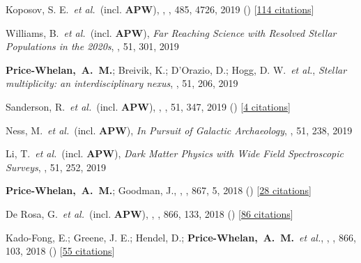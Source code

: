 \item[{\color{deemph}\scriptsize53}]Koposov, S. E.~\textit{et al.}~(incl. \textbf{APW}), , \mnras, 485, 4726, 2019 () [\href{http://adsabs.harvard.edu/abs/2019MNRAS.485.4726K}{114 citations}]

\item[{\color{deemph}\scriptsize52}]Williams, B.~\textit{et al.}~(incl. \textbf{APW}), \textit{Far Reaching Science with Resolved Stellar Populations in the 2020s}, \baas, 51, 301, 2019

\item[{\color{deemph}\scriptsize51}]\textbf{Price-Whelan,~A.~M.}; Breivik, K.; D'Orazio, D.; Hogg, D. W.~\textit{et al.}, \textit{Stellar multiplicity: an interdisciplinary nexus}, \baas, 51, 206, 2019

\item[{\color{deemph}\scriptsize50}]Sanderson, R.~\textit{et al.}~(incl. \textbf{APW}), , \baas, 51, 347, 2019 () [\href{http://adsabs.harvard.edu/abs/2019BAAS...51c.347S}{4 citations}]

\item[{\color{deemph}\scriptsize49}]Ness, M.~\textit{et al.}~(incl. \textbf{APW}), \textit{In Pursuit of Galactic Archaeology}, \baas, 51, 238, 2019

\item[{\color{deemph}\scriptsize48}]Li, T.~\textit{et al.}~(incl. \textbf{APW}), \textit{Dark Matter Physics with Wide Field Spectroscopic Surveys}, \baas, 51, 252, 2019

\item[{\color{deemph}\scriptsize47}]\textbf{Price-Whelan,~A.~M.}; Goodman, J., , \apj, 867, 5, 2018 () [\href{http://adsabs.harvard.edu/abs/2018ApJ...867....5P}{28 citations}]

\item[{\color{deemph}\scriptsize46}]De Rosa, G.~\textit{et al.}~(incl. \textbf{APW}), , \apj, 866, 133, 2018 () [\href{http://adsabs.harvard.edu/abs/2018ApJ...866..133D}{86 citations}]

\item[{\color{deemph}\scriptsize45}]Kado-Fong, E.; Greene, J. E.; Hendel, D.; \textbf{Price-Whelan,~A.~M.}~\textit{et al.}, , \apj, 866, 103, 2018 () [\href{http://adsabs.harvard.edu/abs/2018ApJ...866..103K}{55 citations}]

